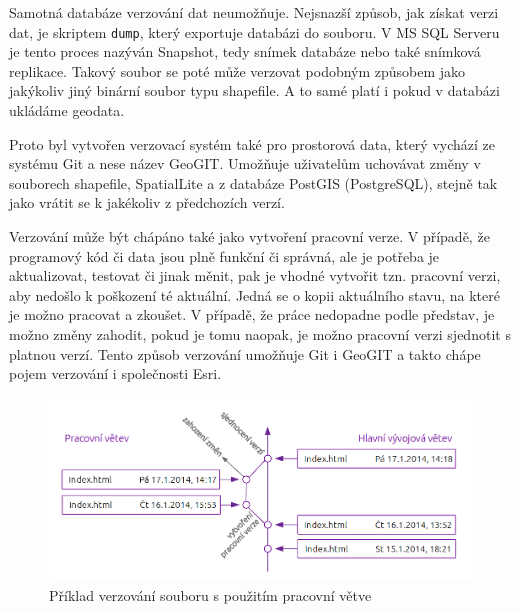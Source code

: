 Samotná databáze verzování dat neumožňuje. Nejsnazší způsob, jak získat verzi dat, je skriptem \texttt{dump}, který exportuje databázi do souboru. V MS SQL Serveru je tento proces nazýván Snapshot, tedy snímek databáze nebo také snímková replikace. Takový soubor se poté může verzovat podobným způsobem jako jakýkoliv jiný binární soubor typu shapefile. A to samé platí i pokud v databázi ukládáme geodata. 

Proto byl vytvořen verzovací systém také pro prostorová data, který vychází ze systému Git a nese název GeoGIT. Umožňuje uživatelům uchovávat změny v souborech shapefile, SpatialLite a z databáze PostGIS (PostgreSQL), stejně tak jako vrátit se k jakékoliv z předchozích verzí. 

Verzování může být chápáno také jako vytvoření pracovní verze. V případě, že programový kód či data jsou plně funkční či správná, ale je potřeba je aktualizovat, testovat či jinak měnit, pak je vhodné vytvořit tzn. pracovní verzi, aby nedošlo k poškození té aktuální. Jedná se o kopii aktuálního stavu, na které je možno pracovat a zkoušet. V případě, že práce nedopadne podle představ, je možno změny zahodit, pokud je tomu naopak, je možno pracovní verzi sjednotit s platnou verzí. Tento způsob verzování umožňuje Git i GeoGIT a takto chápe pojem verzování i společnosti Esri.

          \begin{figure}[H]
            \centering
            \includegraphics[scale=1]{../../../grafy/obr/schema_verzovani_branch_maxiTence.png}
            \caption {Příklad verzování souboru s použitím pracovní větve}
          \end{figure}

        

